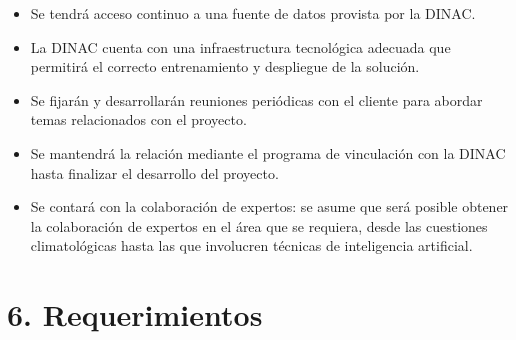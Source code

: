\documentclass[
11pt, %
codirector, %
]{charter}
\begin{document}
\begin{itemize}
	\item Se tendrá acceso continuo a una fuente de datos provista por la DINAC.
	\item La DINAC cuenta con una infraestructura tecnológica adecuada que permitirá el correcto entrenamiento y despliegue de la solución.
	\item Se fijarán y desarrollarán reuniones periódicas con el cliente para abordar temas relacionados con el proyecto.
	\item Se mantendrá la relación mediante el programa de vinculación con la DINAC hasta finalizar el desarrollo del proyecto.
	\item Se contará con la colaboración de expertos: se asume que será posible obtener la colaboración de expertos en el área que se requiera, desde las cuestiones climatológicas hasta las que involucren técnicas de inteligencia artificial.
\end{itemize}

\section{6. Requerimientos}
\label{sec:requerimientos}
\end{document}
